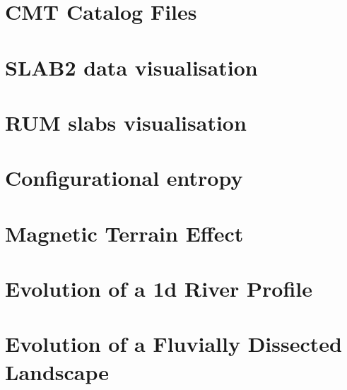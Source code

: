 \documentclass[a4paper,11pt]{report}
\begin{document}
\chapter{CMT Catalog Files\label{f134}} %

\chapter{SLAB2 data visualisation\label{f135}} %

\chapter{RUM slabs visualisation\label{f136}} %

\chapter{Configurational entropy \label{f137}} %

\chapter{Magnetic Terrain Effect \label{f138}} %

\chapter{Evolution of a 1d River Profile\label{f139}} %

\chapter{Evolution of a Fluvially Dissected Landscape \label{f140}} %
\end{document}
